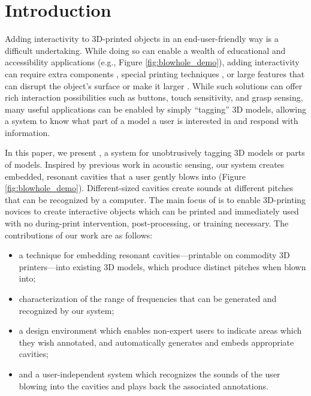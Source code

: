  \section{Introduction}
    Adding interactivity to 3D-printed objects in an end-user-friendly way is a
    difficult undertaking. While doing so can enable a wealth of educational and
    accessibility applications (e.g., Figure \ref{fig:blowhole_demo}), adding
    interactivity can require extra components \cite{Savage:2013kua,
    Hook:2014kp}, special printing techniques \cite{Schmitz:2015vj,
    Bacher:2016ji, Peng:2015hr}, or large features that can disrupt the object's
    surface \cite{Harrison:2012kw, Ou:2016db, Savage:2015cs, Shi:2016ff} or make
    it larger \cite{Li:2016bt}. While such solutions can offer rich interaction
    possibilities such as buttons, touch sensitivity, and grasp sensing, many
    useful applications can be enabled by simply ``tagging'' 3D models, allowing
    a system to know what part of a model a user is interested in and respond
    with information.
    
    In this paper, we present \textit{\bh}, a system for unobtrusively tagging
    3D models or parts of models. Inspired by previous work in acoustic sensing,
    our system creates embedded, resonant cavities that a user gently blows into
    (Figure \ref{fig:blowhole_demo}). Different-sized cavities create sounds at
    different pitches that can be recognized by a computer. The main focus of
    \bh is to enable 3D-printing novices to create interactive objects which can
    be printed and immediately used with no during-print intervention,
    post-processing, or training necessary. The contributions of our work are as
    follows:

    \begin{itemize}
        \item a technique for embedding resonant cavities---printable on
          commodity 3D printers---into existing 3D models, which produce distinct
          pitches when blown into;
        \item characterization of the range of frequencies that can be generated
          and recognized by our system;
        \item a design environment which enables non-expert users to indicate
          areas which they wish annotated, and automatically generates and embeds
          appropriate cavities;
        \item and a user-independent system which recognizes the sounds of the
          user blowing into the cavities and plays back the associated
          annotations.
    \end{itemize}

